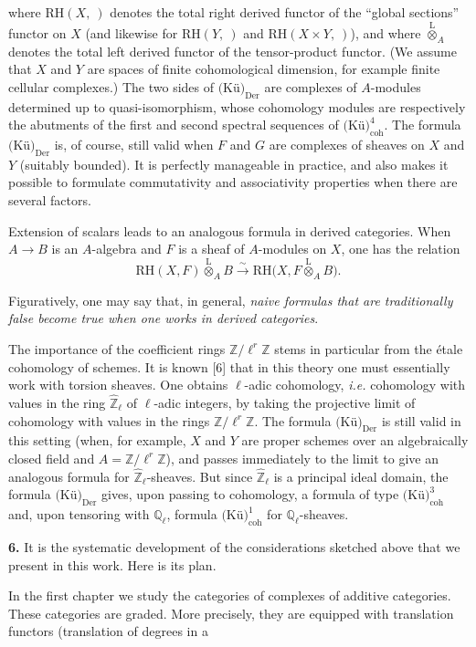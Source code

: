 %
where $\mathrm{RH}(X,{\ })$ denotes the total right derived functor of the
``global sections'' functor on $X$ (and likewise for $\mathrm{RH}(Y,{\ })$ and
$\mathrm{RH}(X\times Y,{\ })$), and where
$\overset{\mathrm L}{\otimes}_A$ denotes the total left derived functor of the
tensor-product functor. (We assume that $X$ and $Y$ are spaces of finite
cohomological dimension, for example finite cellular complexes.) The two
sides of $\text{(Kü)}_{\mathrm{Der}}$ are complexes of $A$-modules
determined up to quasi-isomorphism, whose cohomology modules are respectively
the abutments of the first and second spectral sequences of
$\text{(Kü)}_{\mathrm{coh}}^{4}$. The formula
$\text{(Kü)}_{\mathrm{Der}}$ is, of course, still valid when $F$ and
$G$ are complexes of sheaves on $X$ and $Y$ (suitably bounded). It is
perfectly manageable in practice, and also makes it possible to formulate
commutativity and associativity properties when there are several factors.

Extension of scalars leads to an analogous formula in derived categories.
When $A\to B$ is an $A$-algebra and $F$ is a sheaf of $A$-modules on $X$, one
has the relation
\[
\mathrm{RH}(X,F)\overset{\mathrm L}{\otimes}_A B
\xrightarrow{\sim}
\mathrm{RH}\bigl(X,F\overset{\mathrm L}{\otimes}_A B\bigr).
\]

Figuratively, one may say that, in general,
\emph{naive formulas that are traditionally false become true when one works
in derived categories}.

The importance of the coefficient rings $\mathbb Z/\ell^r\mathbb Z$ stems in
particular from the étale cohomology of schemes. It is known [6] that in this
theory one must essentially work with torsion sheaves. One obtains
$\ell$-adic cohomology, \emph{i.e.} cohomology with values in the ring
$\widehat{\mathbb Z}_{\ell}$ of $\ell$-adic integers, by taking the projective
limit of cohomology with values in the rings $\mathbb Z/\ell^r\mathbb Z$.
The formula $\text{(Kü)}_{\mathrm{Der}}$ is still valid in this
setting (when, for example, $X$ and $Y$ are proper schemes over an
algebraically closed field and $A=\mathbb Z/\ell^r\mathbb Z$), and passes
immediately to the limit to give an analogous formula for
$\widehat{\mathbb Z}_{\ell}$-sheaves. But since
$\widehat{\mathbb Z}_{\ell}$ is a principal ideal domain, the formula
$\text{(Kü)}_{\mathrm{Der}}$ gives, upon passing to cohomology, a
formula of type $\text{(Kü)}_{\mathrm{coh}}^{3}$ and, upon tensoring
with $\mathbb Q_{\ell}$, formula
$\text{(Kü)}_{\mathrm{coh}}^{1}$ for
$\mathbb Q_{\ell}$-sheaves.

\noindent\textbf{6.}\quad
It is the systematic development of the considerations sketched above that
we present in this work. Here is its plan.

In the first chapter we study the categories of complexes of additive
categories. These categories are graded. More precisely, they are equipped
with translation functors (translation of degrees in a
